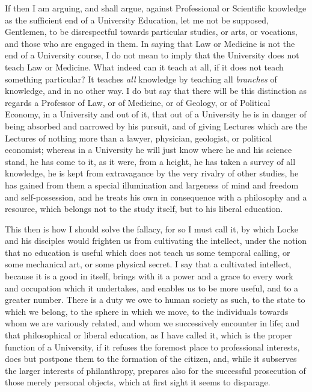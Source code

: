 If then I am arguing, and shall argue, against Professional or
Scientific knowledge as the sufficient end of a University Education,
let me not be supposed, Gentlemen, to be disrespectful towards
particular studies, or arts, or vocations, and those who are engaged
in them. In saying that Law or Medicine is not the end of a University
course, I do not mean to imply that the University does not teach Law
or Medicine. What indeed can it teach at all, if it does not teach
something particular? It teaches \emph{all} knowledge by teaching all \emph{branches}
of knowledge, and in no other way. I do but say that there will be
this distinction as regards a Professor of Law, or of Medicine, or of
Geology, or of Political Economy, in a University and out of it, that
out of a University he is in danger of being absorbed and narrowed by
his pursuit, and of giving Lectures which are the Lectures of nothing
more than a lawyer, physician, geologist, or political economist;
whereas in a University he will just know where he and his science
stand, he has come to it, as it were, from a height, he has taken
a survey of all knowledge, he is kept from extravagance by the
very rivalry of other studies, he has gained from them a special
illumination and largeness of mind and freedom and self-possession,
and he treats his own in consequence with a philosophy and a resource,
which belongs not to the study itself, but to his liberal education.

This then is how I should solve the fallacy, for so I must call it,
by which Locke and his disciples would frighten us from cultivating
the intellect, under the notion that no education is useful which does
not teach us some temporal calling, or some mechanical art, or some
physical secret. I say that a cultivated intellect, because it is a
good in itself, brings with it a power and a grace to every work and
occupation which it undertakes, and enables us to be more useful, and
to a greater number. There is a duty we owe to human society as such,
to the state to which we belong, to the sphere in which we move, to
the individuals towards whom we are variously related, and whom we
successively encounter in life; and that philosophical or liberal
education, as I have called it, which is the proper function of a
University, if it refuses the foremost place to professional
interests, does but postpone them to the formation of the citizen,
and, while it subserves the larger interests of philanthropy, prepares
also for the successful prosecution of those merely personal objects,
which at first sight it seems to disparage.


